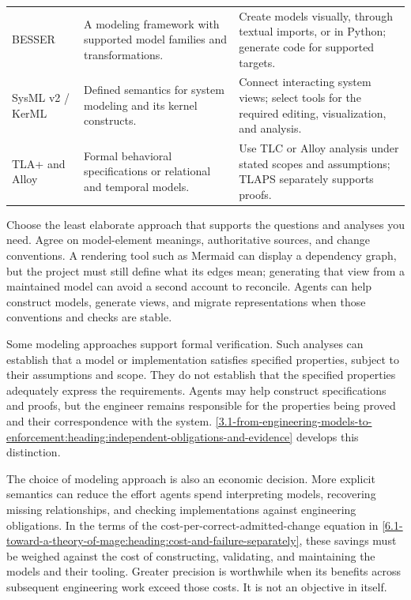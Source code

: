 {\begin{longtable}[]{@{}p{.25\linewidth}p{.31\linewidth}p{.34\linewidth}@{}}
BESSER~\citep{besserDocumentation} & A modeling framework with supported model families and transformations. & Create models visually, through textual imports, or in Python; generate code for supported targets. \\
SysML v2 / KerML~\citep{omg2025sysml,omg2025kerml} & Defined semantics for system modeling and its kernel constructs. & Connect interacting system views; select tools for the required editing, visualization, and analysis. \\
TLA+ and Alloy~\citep{lamport2002,tlaToolboxDocumentation,alloy6Documentation} & Formal behavioral specifications or relational and temporal models. & Use TLC or Alloy analysis under stated scopes and assumptions; TLAPS separately supports proofs. \\
\bottomrule
\end{longtable}
}

Choose the least elaborate approach that supports the questions and analyses you need. Agree on model-element meanings, authoritative sources, and change conventions. A rendering tool such as Mermaid can display a dependency graph, but the project must still define what its edges mean; generating that view from a maintained model can avoid a second account to reconcile. Agents can help construct models, generate views, and migrate representations when those conventions and checks are stable.

Some modeling approaches support formal verification. Such analyses can establish that a model or implementation satisfies specified properties, subject to their assumptions and scope. They do not establish that the specified properties adequately express the requirements. Agents may help construct specifications and proofs, but the engineer remains responsible for the properties being proved and their correspondence with the system. \autoref{3.1-from-engineering-models-to-enforcement:heading:independent-obligations-and-evidence} develops this distinction.

The choice of modeling approach is also an economic decision. More explicit semantics can reduce the effort agents spend interpreting models, recovering missing relationships, and checking implementations against engineering obligations. In the terms of the cost-per-correct-admitted-change equation in \autoref{6.1-toward-a-theory-of-mage:heading:cost-and-failure-separately}, these savings must be weighed against the cost of constructing, validating, and maintaining the models and their tooling. Greater precision is worthwhile when its benefits across subsequent engineering work exceed those costs. It is not an objective in itself.

